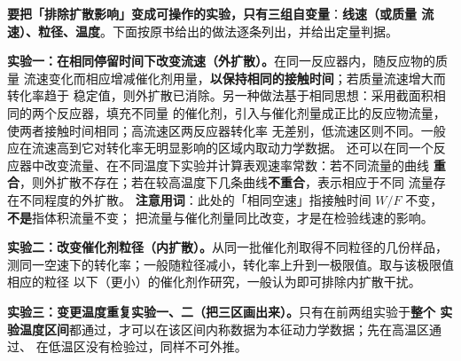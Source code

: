 \textbf{要把「排除扩散影响」变成可操作的实验，只有三组自变量}：\textbf{线速（或质量
流速）、粒径、温度}。下面按原书给出的做法逐条列出，并给出定量判据。

\textbf{实验一：在相同停留时间下改变流速（外扩散）。}在同一反应器内，随反应物的质量
流速变化而相应增减催化剂用量，\textbf{以保持相同的接触时间}；若质量流速增大而转化率趋于
稳定值，则外扩散已消除。另一种做法基于相同思想：采用截面积相同的两个反应器，填充不同量
的催化剂，引入与催化剂量成正比的反应物流量，使两者接触时间相同；高流速区两反应器转化率
无差别，低流速区则不同。一般应在流速高到它对转化率无明显影响的区域内取动力学数据。
还可以在同一个反应器中改变流量、在不同温度下实验并计算表观速率常数：若不同流量的曲线
\textbf{重合}，则外扩散不存在；若在较高温度下几条曲线\textbf{不重合}，表示相应于不同
流量存在不同程度的外扩散。
\textbf{注意用词}：此处的「相同空速」指接触时间 $W/F$ 不变，\textbf{不是}指体积流量不变；
把流量与催化剂量同比改变，才是在检验线速的影响。

\textbf{实验二：改变催化剂粒径（内扩散）。}从同一批催化剂取得不同粒径的几份样品，
测同一空速下的转化率；一般随粒径减小，转化率上升到一极限值。取与该极限值相应的粒径
以下（更小）的催化剂作研究，一般认为即可排除内扩散干扰。

\textbf{实验三：变更温度重复实验一、二（把三区画出来）。}只有在前两组实验于\textbf{整个
实验温度区间}都通过，才可以在该区间内称数据为本征动力学数据；先在高温区通过、
在低温区没有检验过，同样不可外推。

